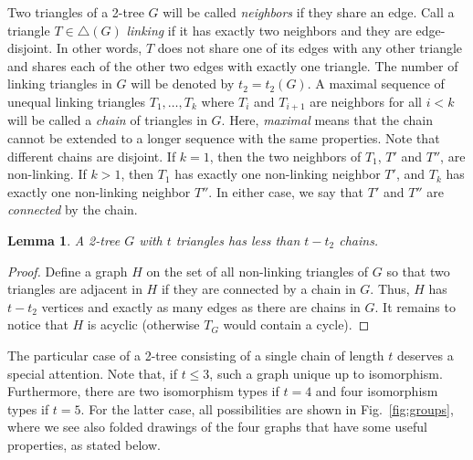 \documentclass[reqno,12pt]{amsart}
\newtheorem{lemma}[theorem]{Lemma}
\begin{document}
Two triangles of a 2-tree $G$ will be called \emph{neighbors}
if they share an edge. Call a triangle $T\in\triangle(G)$ \emph{linking}
if it has exactly two neighbors and they are edge-disjoint.
In other words, $T$ does not share one of its edges with any other triangle
and shares each of the other two edges with exactly one triangle.
The number of linking triangles in $G$ will be denoted by $t_2=t_2(G)$.
A maximal sequence of unequal linking triangles $T_1,\ldots,T_k$ where $T_i$ and $T_{i+1}$
are neighbors for all $i<k$ will be called a \emph{chain} of triangles in $G$.
Here, \emph{maximal} means that the chain cannot be extended to a longer sequence
with the same properties. Note that different chains are disjoint.
If $k=1$, then the two neighbors of $T_1$, $T'$ and $T''$, are non-linking.
If $k>1$, then $T_1$ has exactly one non-linking neighbor $T'$, and
$T_k$ has exactly one non-linking neighbor $T''$. In either case, we say that
$T'$ and $T''$ are \emph{connected} by the chain.

\begin{lemma}\label{lem:chains}
A 2-tree $G$ with $t$ triangles has less than $t-t_2$ chains.
\end{lemma}

\begin{proof}
Define a graph $H$ on the set of all non-linking triangles of $G$ so that
two triangles are adjacent in $H$ if they are connected by a chain in $G$.
Thus, $H$ has $t-t_2$ vertices and exactly as many edges as there are chains
in $G$. It remains to notice that $H$ is acyclic (otherwise $T_G$ would contain
a cycle).
\end{proof}

The particular case of a 2-tree consisting of a single chain of length $t$
deserves a special attention. Note that, if $t\le3$, such a graph unique
up to isomorphism. Furthermore, there are two isomorphism types if $t=4$
and four isomorphism types if $t=5$. For the latter case, all possibilities
are shown in Fig.~\ref{fig:groups}, where we see also
folded drawings of the four graphs that have some useful 
properties, as stated below.
\end{document}
